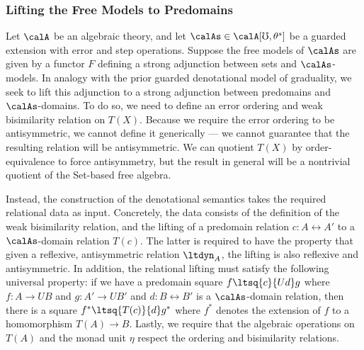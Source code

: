 \documentclass[acmsmall,screen,review,anonymous]{acmart}
\theoremstyle{remark}
\begin{document}

\subsubsection{Lifting the Free Models to Predomains}\label{sec:extending-to-predomains}

Let $\calA$ be an algebraic theory, and let $\calAs \in \calA[\mho, \theta^s]$
be a guarded extension with error and step operations. Suppose the free models
of $\calAs$ are given by a functor $F$ defining a strong adjunction between sets
and $\calAs$-models. In analogy with the prior guarded denotational model of
graduality, we seek to lift this adjunction to a strong adjunction between
predomains and $\calAs$-domains. To do so, we need to define an error ordering
and weak bisimilarity relation on $T(X)$. Because we require the error ordering
to be antisymmetric, we cannot define it generically --- we cannot guarantee
that the resulting relation will be antisymmetric. We can quotient $T(X)$ by
order-equivalence to force antisymmetry, but the result in general will be a
nontrivial quotient of the Set-based free algebra.

Instead, the construction of the denotational semantics takes the required
relational data as input. Concretely, the data consists of the definition of the
weak bisimilarity relation, and the lifting of a predomain relation $c : A \rel
A'$ to a $\calAs$-domain relation $T(c)$. The latter is required to have the
property that given a reflexive, antisymmetric relation $\ltdyn_A$, the lifting
is also reflexive and antisymmetric.
%
In addition, the relational lifting must satisfy the following universal
property: if we have a predomain square $f \ltsq{c}{Ud} g$ where $f : A \to UB$
and $g : A' \to UB'$ and $d : B \rel B'$ is a $\calAs$-domain relation, then
there is a square $f^* \ltsq{T(c)}{d} g^*$ where $f^*$ denotes the extension of
$f$ to a homomorphism $T(A) \to B$.
%
Lastly, we require that the algebraic operations on $T(A)$ and the monad unit
$\eta$ respect the ordering and bisimilarity relations.
\end{document}

